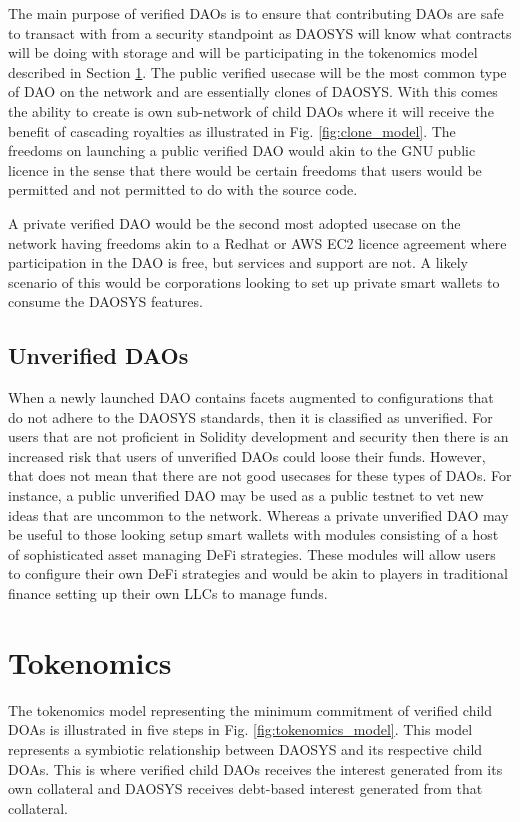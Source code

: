 \documentclass[journal,twocolumn,12pt]{ieeesyscoin}
\begin{document}
The main purpose of verified DAOs is to ensure that contributing DAOs are safe to transact with from a security standpoint as DAOSYS will know what contracts will be doing with storage and will be participating in the tokenomics model described in Section \ref{sec:tokenomics}. The public verified usecase will be the most common type of DAO on the network and are essentially clones of DAOSYS. With this comes the ability to create is own sub-network of child DAOs where it will receive the benefit of cascading royalties as illustrated in Fig. \ref{fig:clone_model}. The freedoms on launching a public verified DAO would akin to the GNU public licence in the sense that there would be certain freedoms that users would be permitted and not permitted to do with the source code.

A private verified DAO would be the second most adopted usecase on the network having freedoms akin to a Redhat or AWS EC2 licence agreement where participation in the DAO is free, but services and support are not. A likely scenario of this would be corporations looking to set up private smart wallets to consume the DAOSYS features.

\subsection{Unverified DAOs}
\label{sec:unverified}

When a newly launched DAO contains facets augmented to configurations that do not adhere to the DAOSYS standards, then it is classified as unverified. For users that are not proficient in Solidity development and security then there is an increased risk that users of unverified DAOs could loose their funds. However, that does not mean that there are not good usecases for these types of DAOs. For instance, a public unverified DAO may be used as a public testnet to vet new ideas that are uncommon to the network. Whereas a private unverified DAO may be useful to those looking setup smart wallets with modules consisting of a host of sophisticated asset managing DeFi strategies. These modules will allow users to configure their own DeFi strategies and would be akin to players in traditional finance setting up their own LLCs to manage funds.

\section{Tokenomics}
\label{sec:tokenomics}

The tokenomics model representing the minimum commitment of verified child DOAs is illustrated in five steps in Fig. \ref{fig:tokenomics_model}. This model represents a symbiotic relationship between DAOSYS and its respective child DOAs. This is where verified child DAOs receives the interest generated from its own collateral and DAOSYS receives debt-based interest generated from that collateral.
\end{document}
